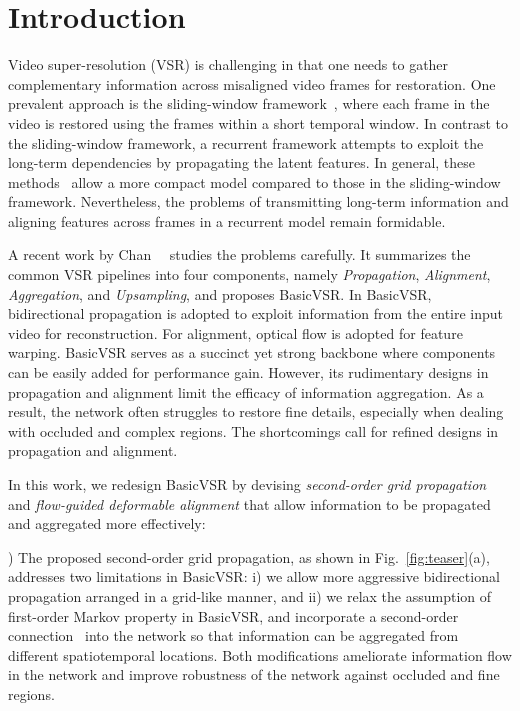 \documentclass[10pt,twocolumn,letterpaper]{article}
\begin{document}
\section{Introduction}
Video super-resolution (VSR) is challenging in that one needs to gather complementary information across misaligned video frames for restoration. One prevalent approach is the sliding-window framework~\cite{haris2019recurrent,tian2020tdan,wang2019edvr,xue2019video}, where each frame in the video is restored using the frames within a short temporal window.
In contrast to the sliding-window framework, a recurrent framework attempts to exploit the long-term dependencies by propagating the latent features. In general, these methods~\cite{fuoli2019efficient,huang2015bidirectional,huang2018video,isobe2020video1,isobe2020revisiting, sajjadi2018frame} allow a more compact model compared to those in the sliding-window framework. Nevertheless, the problems of transmitting long-term information and aligning features across frames in a recurrent model remain formidable.

A recent work by Chan~\etal~\cite{chan2021basicvsr} studies the problems carefully. It summarizes the common VSR pipelines into four components, namely \textit{Propagation}, \textit{Alignment}, \textit{Aggregation}, and \textit{Upsampling}, and proposes BasicVSR. In BasicVSR, bidirectional propagation is adopted to exploit information from the entire input video for reconstruction. For alignment, optical flow is adopted for feature warping. BasicVSR serves as a succinct yet strong backbone where components can be easily added for performance gain.
However, its rudimentary designs in propagation and alignment limit the efficacy of information aggregation. As a result, the network often struggles to restore fine details, especially when dealing with occluded and complex regions. The shortcomings call for refined designs in propagation and alignment.

In this work, we redesign BasicVSR by devising \textit{second-order grid propagation} and \textit{flow-guided deformable alignment} that allow information to be propagated and aggregated more effectively:

) The proposed second-order grid propagation, as shown in Fig.~\ref{fig:teaser}(a), addresses two limitations in BasicVSR: i) we allow more aggressive bidirectional propagation arranged in a grid-like manner, and ii) we relax the assumption of first-order Markov property in BasicVSR, and incorporate a second-order connection~\cite{soltani2016higher} into the network so that information can be aggregated from different spatiotemporal locations. Both modifications ameliorate information flow in the network and improve robustness of the network against occluded and fine regions.
\end{document}
